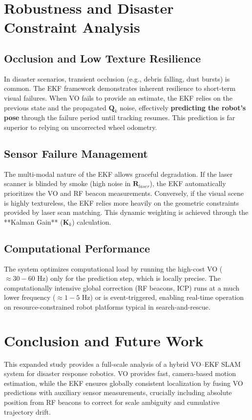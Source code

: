 \documentclass[conference]{IEEEtran}
\begin{document}
\>
\>
\section{Robustness and Disaster Constraint Analysis} %

\subsection{Occlusion and Low Texture Resilience}
In disaster scenarios, transient occlusion (e.g., debris falling, dust bursts) is common. The EKF framework demonstrates inherent resilience to short-term visual failures. When VO fails to provide an estimate, the EKF relies on the previous state and the propagated $\mathbf{Q}_k$ noise, effectively \textbf{predicting the robot's pose} through the failure period until tracking resumes. This prediction is far superior to relying on uncorrected wheel odometry.

\subsection{Sensor Failure Management}
The multi-modal nature of the EKF allows graceful degradation. If the laser scanner is blinded by smoke (high noise in $\mathbf{R}_{laser}$), the EKF automatically prioritizes the VO and RF beacon measurements. Conversely, if the visual scene is highly textureless, the EKF relies more heavily on the geometric constraints provided by laser scan matching. This dynamic weighting is achieved through the **Kalman Gain** ($\mathbf{K}_k$) calculation.

\subsection{Computational Performance}
The system optimizes computational load by running the high-cost VO ($\approx 30-60$ Hz) only for the prediction step, which is locally precise. The computationally intensive global correction (RF beacons, ICP) runs at a much lower frequency ($\approx 1-5$ Hz) or is event-triggered, enabling real-time operation on resource-constrained robot platforms typical in search-and-rescue.

\section{Conclusion and Future Work} %

This expanded study provides a full-scale analysis of a hybrid VO–EKF SLAM system for disaster response robotics. VO provides fast, camera-based motion estimation, while the EKF ensures globally consistent localization by fusing VO predictions with auxiliary sensor measurements, crucially including absolute position from RF beacons to correct for scale ambiguity and cumulative trajectory drift.
\end{document}
